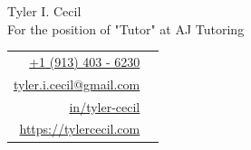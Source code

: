 \documentclass[sans, a4paper, 12pt]{article}
\newcommand{\cvcolor}[1]{{\color{MidnightBlue}#1}}
\begin{document}
\noindent
\begin{minipage}{0.675\linewidth}
  {
    \fontsize{40pt}{50pt}\selectfont
    \noindent
    Tyler I. Cecil
  }\\
  {\Large \color{darkgray}
    {
      \fontsize{16pt}{20pt}\selectfont
      \noindent
      For the position of "Tutor" at AJ Tutoring
    }
  }
\end{minipage}
\hfill
{
  \fontsize{10pt}{13pt}\selectfont
  \begin{tabular}{|rl}
    \href{tel:+1 (913) 403 - 6230}{+1 (913) 403 - 6230}&\cvcolor{\faPhone} \\
    \href{mailto:tyler.i.cecil@gmail.com}{tyler.i.cecil@gmail.com}&\cvcolor{\faEnvelope} \\
    \href{https://www.linkedin.com/in/tyler-cecil/}{in/tyler-cecil}&\cvcolor{\faLinkedinSquare} \\
    \href{https://tylercecil.com}{https://tylercecil.com}&\cvcolor{\faGlobe} \\
  \end{tabular}
  }

\vspace{0.5em}
\noindent\hrulefill
\vspace{1em}
\end{document}
